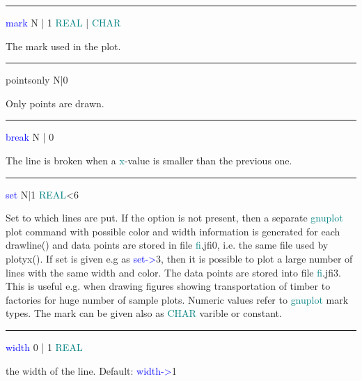 \hrule 
\vspace{0.3cm} 
\noindent \textcolor{blue}{mark}  \tabto{3cm}  N | 1  \tabto{5cm}   \textcolor{teal}{REAL} | \textcolor{teal}{CHAR}  \tabto{7cm} 
\begin{changemargin}{3cm}{0cm} 
\noindent  The mark used in the plot. 
\end{changemargin} 
\vspace{0.3cm} 
\hrule 
\vspace{0.3cm} 
\noindent pointsonly \tabto{3cm} N|0 \tabto{5cm}   \tabto{7cm} 
\begin{changemargin}{3cm}{0cm} 
\noindent Only points are drawn. 
\end{changemargin} 
\vspace{0.3cm} 
\hrule 
\vspace{0.3cm} 
\noindent \textcolor{blue}{break}  \tabto{3cm}  N | 0  \tabto{5cm}    \tabto{7cm} 
\begin{changemargin}{3cm}{0cm} 
\noindent  The line is broken when a \textcolor{teal}{x}-value is smaller than the previous one. 
\end{changemargin} 
\vspace{0.3cm} 
\hrule 
\vspace{0.3cm} 
\noindent \textcolor{blue}{set}  \tabto{3cm}  N|1  \tabto{5cm}   \textcolor{teal}{REAL}<6  \tabto{7cm} 
\begin{changemargin}{3cm}{0cm} 
\noindent  Set to which lines are put. If the option is not present, 
then a separate \textcolor{teal}{gnuplot} plot command with possible color and width information 
is generated for each \textcolor{VioletRed}{drawline}() and data points are stored 
in file \textcolor{teal}{fi}.jfi0, i.e. the same file used by \textcolor{VioletRed}{plotyx}(). 
If set is given e.g as \textcolor{blue}{set->}3, then it is possible to plot a large number of lines 
with the same width and color. The data points are stored into file \textcolor{teal}{fi}.jfi3. This is 
useful e.g. when drawing figures showing transportation of timber to factories 
for huge number of sample plots. 
Numeric values refer to \textcolor{teal}{gnuplot} mark types. 
The mark can be given also as \textcolor{teal}{CHAR} varible or constant. 
\end{changemargin} 
\vspace{0.3cm} 
\hrule 
\vspace{0.3cm} 
\noindent \textcolor{blue}{width}  \tabto{3cm}  0 | 1  \tabto{5cm}   \textcolor{teal}{REAL}  \tabto{7cm} 
\begin{changemargin}{3cm}{0cm} 
\noindent  the width of the line. Default: \textcolor{blue}{width->}1 
\end{changemargin} 
